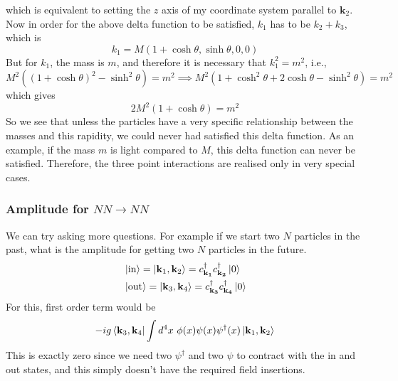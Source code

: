 \documentclass[11pt]{article}
\newcommand{\cdag}[1]{c^\dagger_\mathbf{#1}}
\numberwithin{equation}{section}
\begin{document}
    which is equivalent to setting the \(z\) axis of my coordinate system parallel to \(\textbf{k}_2\). \\
    Now in order for the above delta function to be satisfied, \(k_1\) has to be \(k_2 + k_3\), which is  
    \begin{equation*}
        k_1 = M(1+\cosh\theta, \sinh\theta, 0, 0)
    \end{equation*}
    But for \(k_1\), the mass is \(m\), and therefore it is necessary that \(k_1^2 = m^2\), i.e.,
    \begin{equation*}
        M^2((1+\cosh\theta)^2 - \sinh^2\theta) = m^2 \implies M^2(1 + \cosh^2\theta + 2\cosh\theta - \sinh^2\theta) = m^2
    \end{equation*}
    which gives 
    \begin{equation*}
        2M^2(1+\cosh\theta) = m^2
    \end{equation*}
    So we see that unless the particles have a very specific relationship between the masses and this rapidity, we could never had satisfied this delta function. As an example, if the mass \(m\) is light compared to \(M\), this delta function can never be satisfied. Therefore, the three point interactions are realised only in very special cases.
    
    \subsubsection{Amplitude for \(NN\to NN\)}

    We can try asking more questions. For example if we start two \(N\) particles in the past, what is the amplitude for getting two \(N\) particles in the future. 
    \begin{align*}
        &\ket{\text{in}} = \ket{\textbf{k}_1, \textbf{k}_2} = \cdag{k_1}\cdag{k_2}\ket{0}\\
        &\ket{\text{out}} = \ket{\textbf{k}_3, \textbf{k}_4} = \cdag{k_3}\cdag{k_4}\ket{0}\\
    \end{align*}
    For this, first order term would be 
    \begin{equation*}
        -ig\bra{\textbf{k}_3, \textbf{k}_4}\int d^4 x ~ \phi(x) \psi(x) \psi^\dagger(x) \ket{\textbf{k}_1, \textbf{k}_2}
    \end{equation*}
    This is exactly zero since we need two \(\psi^\dagger\) and two \(\psi\) to contract with the in and out states, and this simply doesn't have the required field insertions. \\
\end{document}
